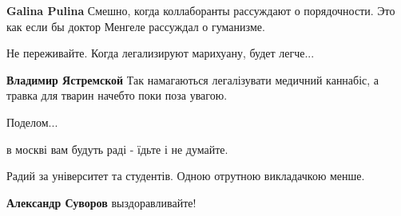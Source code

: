 \begin{itemize}
\begin{itemize}
\textbf{Galina Pulina} Смешно, когда коллаборанты рассуждают о порядочности. Это как если бы доктор Менгеле рассуждал о гуманизме.
\end{itemize}

 
Не переживайте. Когда легализируют марихуану, будет легче...

\begin{itemize}
 
\textbf{Владимир Ястремской} Так намагаються легалізувати медичний каннабіс, а травка для тварин начебто поки поза увагою.
\end{itemize}

 
Поделом...

 
в москві вам будуть раді - їдьте і не думайте.

 
Радий за університет та студентів. Одною отрутною викладачкою менше.

\begin{itemize}
 
\textbf{Александр Суворов} выздоравливайте!


\end{itemize}
\end{itemize}
